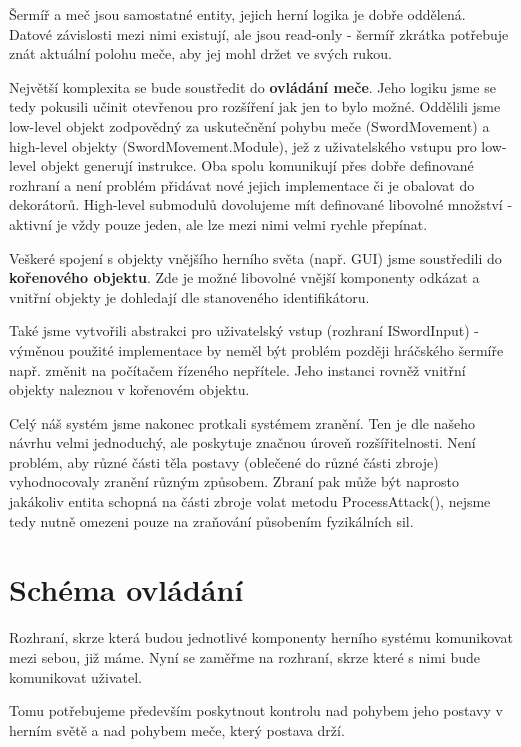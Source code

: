 Šermíř a meč jsou samostatné entity, jejich herní logika je dobře oddělená. Datové závislosti mezi nimi existují, ale jsou read-only - šermíř zkrátka potřebuje znát aktuální polohu meče, aby jej mohl držet ve svých rukou.

Největší komplexita se bude soustředit do \textbf{ovládání meče}. Jeho logiku jsme se tedy pokusili učinit otevřenou pro rozšíření jak jen to bylo možné. Oddělili jsme low-level objekt zodpovědný za uskutečnění pohybu meče (SwordMovement) a high-level objekty (SwordMovement.Module), jež z uživatelského vstupu pro low-level objekt generují instrukce. Oba spolu komunikují přes dobře definované rozhraní a není problém přidávat nové jejich implementace či je obalovat do dekorátorů. High-level submodulů dovolujeme mít definované libovolné množství - aktivní je vždy pouze jeden, ale lze mezi nimi velmi rychle přepínat. 

Veškeré spojení s objekty vnějšího herního světa (např. GUI) jsme soustředili do \textbf{kořenového objektu}. Zde je možné libovolné vnější komponenty odkázat a vnitřní objekty je dohledají dle stanoveného identifikátoru.

Také jsme vytvořili abstrakci pro uživatelský vstup (rozhraní ISwordInput) - výměnou použité implementace by neměl být problém později hráčského šermíře např. změnit na počítačem řízeného nepřítele. Jeho instanci rovněž vnitřní objekty naleznou v kořenovém objektu. 

Celý náš systém jsme nakonec protkali systémem zranění. Ten je dle našeho návrhu velmi jednoduchý, ale poskytuje značnou úroveň rozšířitelnosti. Není problém, aby různé části těla postavy (oblečené do různé části zbroje) vyhodnocovaly zranění různým způsobem. Zbraní pak může být naprosto jakákoliv entita schopná na části zbroje volat metodu ProcessAttack(), nejsme tedy nutně omezeni pouze na zraňování působením fyzikálních sil.

\pagebreak

\section{Schéma ovládání} 

Rozhraní, skrze která budou jednotlivé komponenty herního systému komunikovat mezi sebou, již máme. Nyní se zaměřme na rozhraní, skrze které s nimi bude komunikovat uživatel.

Tomu potřebujeme především poskytnout kontrolu nad pohybem jeho postavy v herním světě a nad pohybem meče, který postava drží.

